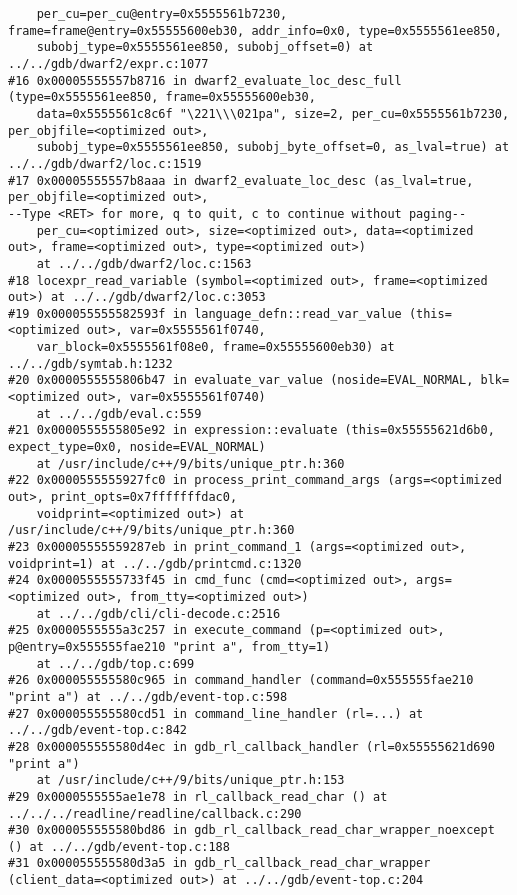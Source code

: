 \documentclass{report}
\begin{document}
\begin{verbatim}
    per_cu=per_cu@entry=0x5555561b7230, frame=frame@entry=0x55555600eb30, addr_info=0x0, type=0x5555561ee850, 
    subobj_type=0x5555561ee850, subobj_offset=0) at ../../gdb/dwarf2/expr.c:1077
#16 0x00005555557b8716 in dwarf2_evaluate_loc_desc_full (type=0x5555561ee850, frame=0x55555600eb30, 
    data=0x5555561c8c6f "\221\\\021pa", size=2, per_cu=0x5555561b7230, per_objfile=<optimized out>, 
    subobj_type=0x5555561ee850, subobj_byte_offset=0, as_lval=true) at ../../gdb/dwarf2/loc.c:1519
#17 0x00005555557b8aaa in dwarf2_evaluate_loc_desc (as_lval=true, per_objfile=<optimized out>, 
--Type <RET> for more, q to quit, c to continue without paging--
    per_cu=<optimized out>, size=<optimized out>, data=<optimized out>, frame=<optimized out>, type=<optimized out>)
    at ../../gdb/dwarf2/loc.c:1563
#18 locexpr_read_variable (symbol=<optimized out>, frame=<optimized out>) at ../../gdb/dwarf2/loc.c:3053
#19 0x000055555582593f in language_defn::read_var_value (this=<optimized out>, var=0x5555561f0740, 
    var_block=0x5555561f08e0, frame=0x55555600eb30) at ../../gdb/symtab.h:1232
#20 0x0000555555806b47 in evaluate_var_value (noside=EVAL_NORMAL, blk=<optimized out>, var=0x5555561f0740)
    at ../../gdb/eval.c:559
#21 0x0000555555805e92 in expression::evaluate (this=0x55555621d6b0, expect_type=0x0, noside=EVAL_NORMAL)
    at /usr/include/c++/9/bits/unique_ptr.h:360
#22 0x0000555555927fc0 in process_print_command_args (args=<optimized out>, print_opts=0x7fffffffdac0, 
    voidprint=<optimized out>) at /usr/include/c++/9/bits/unique_ptr.h:360
#23 0x00005555559287eb in print_command_1 (args=<optimized out>, voidprint=1) at ../../gdb/printcmd.c:1320
#24 0x0000555555733f45 in cmd_func (cmd=<optimized out>, args=<optimized out>, from_tty=<optimized out>)
    at ../../gdb/cli/cli-decode.c:2516
#25 0x0000555555a3c257 in execute_command (p=<optimized out>, p@entry=0x555555fae210 "print a", from_tty=1)
    at ../../gdb/top.c:699
#26 0x000055555580c965 in command_handler (command=0x555555fae210 "print a") at ../../gdb/event-top.c:598
#27 0x000055555580cd51 in command_line_handler (rl=...) at ../../gdb/event-top.c:842
#28 0x000055555580d4ec in gdb_rl_callback_handler (rl=0x55555621d690 "print a")
    at /usr/include/c++/9/bits/unique_ptr.h:153
#29 0x0000555555ae1e78 in rl_callback_read_char () at ../../../readline/readline/callback.c:290
#30 0x000055555580bd86 in gdb_rl_callback_read_char_wrapper_noexcept () at ../../gdb/event-top.c:188
#31 0x000055555580d3a5 in gdb_rl_callback_read_char_wrapper (client_data=<optimized out>) at ../../gdb/event-top.c:204

\end{verbatim}
\end{document}
